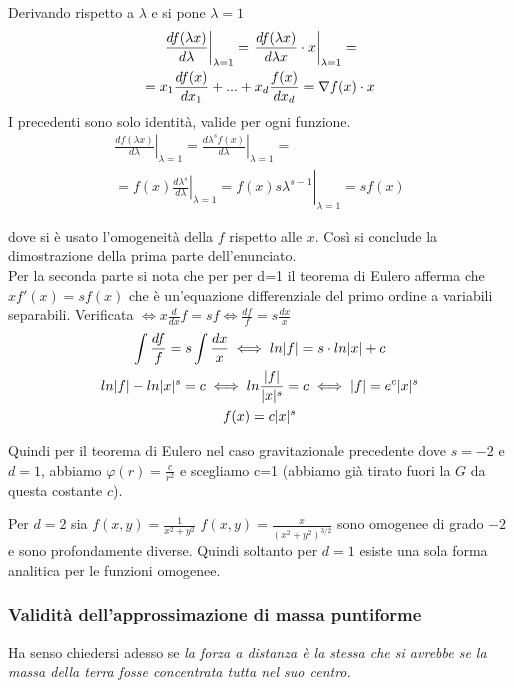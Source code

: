 \documentclass[Main.tex]{subfiles}
\begin{document}
\begin{dm}
Derivando rispetto a $\lambda$ e si pone $\lambda=1$
\begin{gather*}\notag
	\left. \frac{d f(\lambda x)}{d\lambda}\right|_{\lambda=1} = \left. \frac{d f(\lambda x)}{d \lambda x} \cdot x \right|_{\lambda=1} = \\ =x_1 \frac{d f(x)}{dx_1} + ... + x_d \frac{f(x)}{dx_d}=\nabla f(x) \cdot x
\end{gather*} 
I precedenti sono solo identità, valide per ogni funzione.
\begin{gather}
	\left. \frac{d f(\lambda x)}{d\lambda} \right|_{\lambda=1} = \left. \frac{d \lambda^s f(x)}{d\lambda}\right|_{\lambda=1} =\\ = \left. f(x) \left. \frac{d \lambda^s}{d\lambda} \right|_{\lambda=1}= f(x) s \lambda^{s-1} \right|_{\lambda=1}=s f(x)
\end{gather}

dove si è usato l'omogeneità della $f$ rispetto alle $x$. Così si conclude la dimostrazione della prima parte dell'enunciato. \\

Per la seconda parte si nota che per per d=1 il teorema di Eulero afferma che $xf' (x) = s f(x)$ che è un'equazione differenziale del primo ordine a variabili separabili.
Verificata $\iff  x\frac{d}{dx}f = sf \iff \frac{df}{f} = s \frac{dx}{x}$
\begin{gather}\notag
	\int \frac{df}{f} = s \int \frac{dx}{x} \iff ln|f| = s \cdot ln|x| + c
\\ \notag
	ln |f| - ln |x| ^ s = c \iff ln \frac{|f|}{|x|^s}= c \iff |f| = e^c |x|^s
\\
	f(x) = c |x|^s
\end{gather}

Quindi per il teorema di Eulero nel caso gravitazionale precedente dove $s=-2$ e $d=1$, abbiamo $\varphi(r) = \frac{c}{r^2}$ e scegliamo c=1 (abbiamo già tirato fuori la $G$ da questa costante $c$).
\end{dm}

\begin{osservazione}
Per $d=2$ sia $f(x,y) = \frac{1}{x^2+y^2}$ $\hat f (x,y) = \frac{x}{(x^2+y^2)^{3/2}}$ sono omogenee di grado $-2$ e sono profondamente diverse. Quindi soltanto per $d=1$ esiste una sola forma analitica per le funzioni omogenee.
\end{osservazione}

\newpage
\subsubsection{Validità dell'approssimazione di massa puntiforme}
Ha senso chiedersi adesso se \emph{la forza a distanza è la stessa che si avrebbe se la massa della terra fosse concentrata tutta nel suo centro.} 
\end{document}
